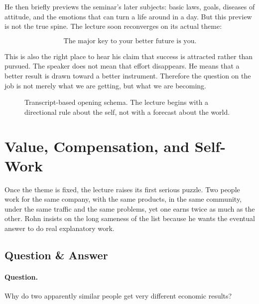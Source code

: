 He then briefly previews the seminar's later subjects: basic laws, goals, diseases of attitude, and the emotions that can turn a life around in a day. But this preview is not the true spine. The lecture soon reconverges on its actual theme:

\begin{equation}
\text{The major key to your better future is you.}
\end{equation}

This is also the right place to hear his claim that success is attracted rather than pursued. The speaker does not mean that effort disappears. He means that a better result is drawn toward a better instrument. Therefore the question on the job is not merely what we are getting, but what we are becoming.

\begin{figure}[t]
\centering
{}
\caption{Transcript-based opening schema. The lecture begins with a directional rule about the self, not with a forecast about the world.}
\end{figure}

\section{Value, Compensation, and Self-Work}

Once the theme is fixed, the lecture raises its first serious puzzle. Two people work for the same company, with the same products, in the same community, under the same traffic and the same problems, yet one earns twice as much as the other. Rohn insists on the long sameness of the list because he wants the eventual answer to do real explanatory work.

\subsection{Question \& Answer}

\paragraph{Question.} Why do two apparently similar people get very different economic results?


